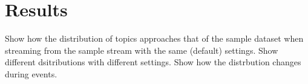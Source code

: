 \chapter{Results}
\label{ch:results}

Show how the distribution of topics approaches that of the sample dataset when streaming from the sample stream with the same (default) settings.
Show different dsitributions with different settings.
Show how the distrbution changes during events.
